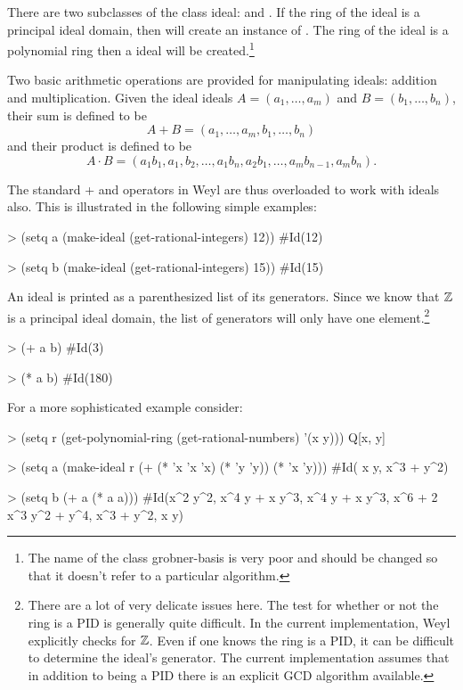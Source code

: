 There are two subclasses of the class ideal:  and
. If the ring of the ideal is a principal ideal
domain, then  will create an instance of
. The ring  of the ideal is a polynomial ring then
a  ideal will be created.\footnote{The name of
the class {\sf grobner-basis} is very poor and should be changed so
that it doesn't refer to a particular algorithm.}

Two basic arithmetic operations are provided for manipulating ideals:
addition and multiplication.  Given the ideal ideals $A = (a_1,
\ldots, a_m)$ and $B = (b_1, \ldots, b_n)$, their sum is defined to be
\[
A+B = (a_1, \ldots, a_m, b_1, \ldots, b_n)
\]
and their product is defined to be 
\[
A \cdot B  =
 (a_1 b_1, a_1, b_2, \ldots, a_1 b_n, a_2 b_1,\ldots, a_m b_{n-1}, a_m b_n).
\]
  
The standard {\sf +} and {\sf *} operators in Weyl are thus overloaded
to work with ideals also. This is illustrated in the following simple
examples:
  
\begin{code}
> (setq a (make-ideal (get-rational-integers) 12))
#Id(12)
  
> (setq b (make-ideal (get-rational-integers) 15))
#Id(15)
\end{code}
  
An ideal is printed as a parenthesized list of its generators. Since
we know that ${\Bbb Z}$ is a principal ideal domain, the list of generators
will only have one element.\footnote{There are a lot of very delicate
issues here.  The test for whether or not the ring is a PID is
generally quite difficult.  In the current implementation, Weyl
explicitly checks for ${\Bbb Z}$.  Even if one knows the ring is a PID, it
can be difficult to determine the ideal's generator.  The current
implementation assumes that in addition to being a PID there is an
explicit GCD algorithm available.}
 
\begin{code}
> (+ a b)
#Id(3)

> (* a b)
#Id(180)
\end{code}
  
For a more sophisticated example consider:
\begin{code}  
> (setq r (get-polynomial-ring (get-rational-numbers) '(x y)))
Q[x, y]
  
> (setq a (make-ideal r (+ (* 'x 'x 'x) (* 'y 'y)) (* 'x 'y)))
#Id( x y,  x^3 +  y^2)

> (setq b (+ a (* a a)))
#Id(x^2 y^2, x^4 y + x y^3, x^4 y +  x y^3, x^6 + 2 x^3 y^2 + y^4, x^3 + y^2, x y)
\end{code}

